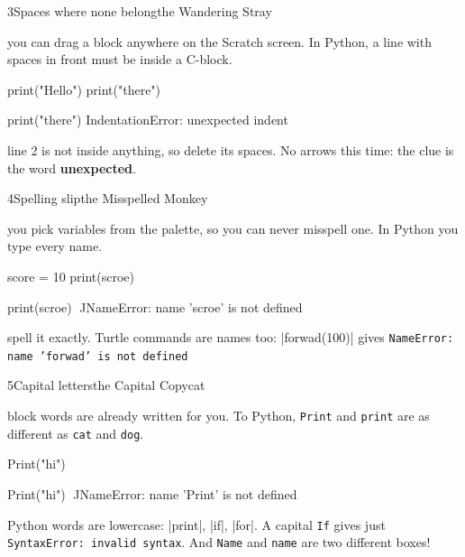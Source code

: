 \begin{bzcard}{3}{Spaces where none belong}{the Wandering Stray}
\noindent\begin{minipage}[c]{0.43\linewidth}
 you can drag a block anywhere on the Scratch screen. In Python, a line with spaces in front must be inside a C-block.
\end{minipage}\hfill
\begin{minipage}[c]{0.54\linewidth}
\begin{bzsnip}
print("Hello")
    print("there")
\end{bzsnip}
\end{minipage}\par
\begin{bzerror}
    print("there")
IndentationError: unexpected indent
\end{bzerror}
 line 2 is not inside anything, so delete its spaces. No arrows this time: the clue is the word \textbf{unexpected}.
\end{bzcard}

\begin{bzcard}{4}{Spelling slip}{the Misspelled Monkey}
\noindent\begin{minipage}[c]{0.43\linewidth}
 you pick variables from the palette, so you can never misspell one. In Python you type every name.
\end{minipage}\hfill
\begin{minipage}[c]{0.54\linewidth}
\begin{bzsnip}
score = 10
print(scroe)
\end{bzsnip}
\end{minipage}\par
\begin{bzerror}
    print(scroe)
          ^^^^^
NameError: name 'scroe' is not defined
\end{bzerror}
 spell it exactly. Turtle commands are names too: \py|forwad(100)| gives \texttt{NameError: name 'forwad' is not defined}
\end{bzcard}

\begin{bzcard}{5}{Capital letters}{the Capital Copycat}
\noindent\begin{minipage}[c]{0.43\linewidth}
 block words are already written for you. To Python, \texttt{Print} and \texttt{print} are as different as \texttt{cat} and \texttt{dog}.
\end{minipage}\hfill
\begin{minipage}[c]{0.54\linewidth}
\begin{bzsnip}
Print("hi")
\end{bzsnip}
\end{minipage}\par
\begin{bzerror}
    Print("hi")
    ^^^^^
NameError: name 'Print' is not defined
\end{bzerror}
 Python words are lowercase: \py|print|, \py|if|, \py|for|. A capital \texttt{If} gives just \texttt{SyntaxError: invalid syntax}. And \texttt{Name} and \texttt{name} are two different boxes!
\end{bzcard}

